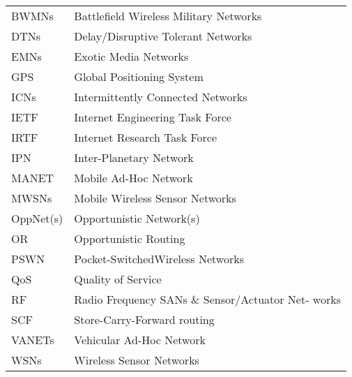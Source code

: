 %

\begin{tabular}{ll}
BWMNs & Battlefield Wireless Military Networks\\
DTNs & Delay/Disruptive Tolerant Networks\\
EMNs & Exotic Media Networks\\
GPS & Global Positioning System\\
ICNs & Intermittently Connected Networks\\
IETF & Internet Engineering Task Force\\
IRTF & Internet Research Task Force\\
IPN & Inter-Planetary Network\\
MANET & Mobile Ad-Hoc Network\\
MWSNs & Mobile Wireless Sensor Networks\\
OppNet(s) & Opportunistic Network(s)\\
OR & Opportunistic Routing\\
PSWN & Pocket-SwitchedWireless Networks\\
QoS & Quality of Service\\
RF & Radio Frequency
SANs \& Sensor/Actuator Net- works\\
SCF & Store-Carry-Forward routing\\
VANETs & Vehicular Ad-Hoc Network\\
WSNs & Wireless Sensor Networks\\
\end{tabular}


